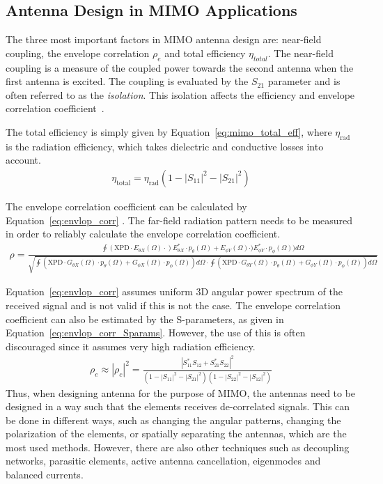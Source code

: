 \subsection{Antenna Design in MIMO Applications}
The three most important factors in MIMO antenna design are: near-field coupling, the envelope correlation $\rho_e$ and total efficiency $\eta_{total}$. The near-field coupling is a measure of the coupled power towards the second antenna when the first antenna is excited. The coupling is evaluated by the $S_{21}$ parameter and is often referred to as the \emph{isolation}. This isolation affects the efficiency and envelope correlation coefficient~\cite{Tatomirescu2011PortIsolation}. 

The total efficiency is simply given by Equation~\ref{eq:mimo_total_eff}\cite{Tatomirescu2011PortIsolation}, where $\eta_{\text{rad}}$ is the radiation efficiency, which takes dielectric and conductive losses into account. 
\begin{align} 
\label{eq:mimo_total_eff}
\eta_{\text{total}}=\eta_{\text{rad}} (1-|S_{11}|^2 - |S_{21}|^2)
\end{align}

The envelope correlation coefficient can be calculated by Equation~\ref{eq:envlop_corr} \cite{Tatomirescu2011PortIsolation}. The far-field radiation pattern needs to be measured in order to reliably calculate the envelope correlation coefficient.
\begin{align} 
\label{eq:envlop_corr}
\rho = \frac{\oint(\text{XPD} \cdot E_{\theta X}(\Omega) \cdot) E^*_{\theta X} \cdot p_\theta(\Omega)+E_{\phi Y}(\Omega) \cdot) E^*_{\phi Y} \cdot p_\phi(\Omega) )d\Omega}{\sqrt{\oint(\text{XPD}\cdot G_{\theta X}(\Omega) \cdot p_\theta(\Omega)+G_{\phi X}(\Omega) \cdot p_\phi(\Omega))d\Omega \cdot \oint(\text{XPD}\cdot G_{\theta Y}(\Omega) \cdot p_\theta(\Omega)+G_{\phi Y}(\Omega) \cdot p_\phi(\Omega))d\Omega }}
\end{align}

Equation~\ref{eq:envlop_corr} assumes uniform 3D angular power spectrum of the received signal and is not valid if this is not the case. The envelope correlation coefficient can also be estimated by the S-parameters, as given in Equation~\ref{eq:envlop_corr_Sparams}\cite{Alain2010MIMO}. However, the use of this is often discouraged since it assumes very high radiation efficiency. \cite{}
\begin{align}
\label{eq:envlop_corr_Sparams}
  \rho_e \approx |\rho_c|^2 = \frac{|S^*_{11}S_{12}+S^*_{21}S_{22}|^2}{(1-|S_{11}|^2-|S_{21}|^2)(1-|S_{22}|^2-|S_{12}|^2)}
\end{align}
Thus, when designing antenna for the purpose of MIMO, the antennas need to be designed in a way such that the elements receives de-correlated signals. This can be done in different ways, such as changing the angular patterns, changing the polarization of the elements, or spatially separating the antennas, which are the most used methods. However, there are also other techniques such as decoupling networks, parasitic elements, active antenna cancellation, eigenmodes and balanced currents. 

